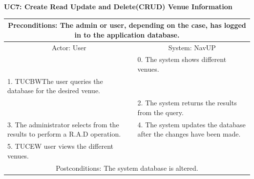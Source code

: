 \documentclass{article}
\begin{document}
				\vspace{5mm}
                \begin{flushleft}
                \textbf{UC7: Create Read Update and Delete(CRUD) Venue Information}\\
                \end{flushleft}
        		\centering			
       		 \small
       		 \begin{tabular}{|p{8cm}|p{8cm}|}
       		 \hline
       		 \multicolumn{2}{c}{Preconditions: The admin or user, depending on the case, has logged in to the application database.} \\
       		 \hline
       		 \multicolumn{1}{c}{Actor: User} & \multicolumn{1}{c}{ System: NavUP} \\
        		\hline
       		 & 0.	The system shows different venues.\\
       		 \hline
       		 1.	TUCBWThe user queries the database for the desired venue.\\
 				&2.	The system returns the results from the query.\\
        		\hline
       		 3.	The administrator selects from the results to perform a R.A.D operation. & 4.	The system updates the database after the changes have been made.\\
				\hline
					5.	TUCEW user views the different venues.&\\
       		 \hline
        		\multicolumn{2}{c}{Postconditions: The system database is altered.} \\
        		\hline
        \end{tabular} 
       
       \newpage
       
\end{document}
